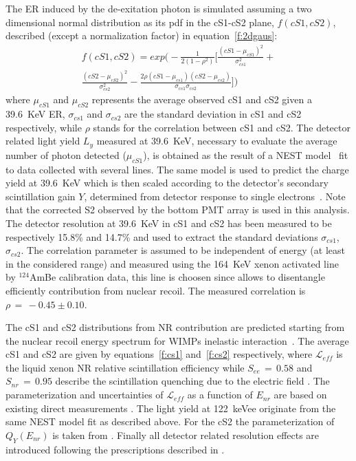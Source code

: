 The ER induced by the de-exitation photon is simulated assuming a two dimensional normal distribution as its pdf in the cS1-cS2 plane, $f(cS1,cS2)$, 
described (except a normalization factor) in equation~\ref{f:2dgaus}:
\begin{multline}
	f(cS1,cS2)  = exp \Big( -\frac{1}{2(1-\rho^2)} \Big[ \frac{(cS1 - \mu_{cS1})^2}{\sigma_{cs1}^2} + \\ 
	 \frac{(cS2 - \mu_{cS2})^2}{\sigma_{cs2}^2} - \frac{2\rho(cS1 - \mu_{cs1}) (cS2 - \mu_{cs2})} {\sigma_{cs1}\sigma_{cs2}} \Big] \Big) 
\label{f:2dgaus}
\end{multline}
where $\mu_{cS1}$ and $\mu_{cS2}$ 
represents the average observed cS1 and cS2 given a 39.6~KeV ER, $\sigma_{cs1}$ and $\sigma_{cs2}$ are the standard deviation in cS1 and cS2 respectively,
while $\rho$ stands for the correlation between cS1 and cS2.
The detector related light yield $L_y$ measured at 39.6~KeV, necessary to evaluate the average number of photon detected ($\mu_{cS1}$),
is obtained as the result of a NEST model~\cite{NEST,Geant1,Geant2} fit to data collected with several lines.  The same model is used to predict the charge yield at
39.6~KeV which is then scaled according to the detector's secondary scintillation gain $Y$, determined from detector response to single electrons~\cite{SingleE}.
Note that the corrected S2 observed by the bottom PMT array is used in this analysis.  
The detector resolution at 39.6~KeV in cS1 and cS2 has been measured to be respectively 15.8\% and 14.7\% and used to extract the standard 
deviations $\sigma_{cs1}$, $\sigma_{cs2}$.  The correlation parameter is assumed to be independent of energy (at least in the considered range) and measured
using the 164~KeV xenon activated line by $^{124}$AmBe calibration data, this line is choosen since allows to disentangle efficiently contribution from nuclear recoil.
The measured correlation is $\rho \, = \, -0.45 \pm 0.10$. 


The cS1 and cS2 distributions from NR contribution are predicted starting from the nuclear recoil energy spectrum
for WIMPs inelastic interaction~\cite{inelastic_th}. The average cS1 and cS2 are given by equations~\ref{f:cs1} and~\ref{f:cs2} respectively,
where $\mathcal{L}_{eff}$ is the liquid xenon NR relative scintillation efficiency while $S_{ee} \, = \, 0.58$  and $S_{nr} \, = \, 0.95$ describe the scintillation 
quenching due to the electric field \cite{ScintQuenching}. The parameterization and uncertainties of $\mathcal{L}_{eff}$ as a function of $E_{nr}$ are based on existing 
direct measurements \cite{run8Result}. The light yield at 122~keVee originate from the same NEST model fit as described above. For the cS2 the parameterization 
of $Q_{Y}(E_{nr})$ is taken from \cite{QY}.
Finally all detector related resolution effects are introduced following the prescriptions described in \cite{dataAnalysis}.

